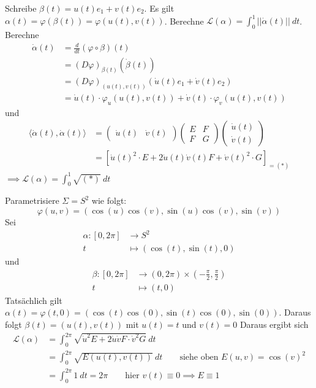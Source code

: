 \documentclass[../main.tex]{subfiles}
\begin{document}
Schreibe $\beta (t) = u(t)e_1 + v(t)e_2$. Es gilt $\alpha(t) = \varphi(\beta(t))=\varphi(u(t),v(t))$.
Berechne $\mathcal{L}(\alpha)= \int _0^1 ||\dot{\alpha}(t)|| \ dt$.
Berechne \begin{align*}
    \dot{\alpha}(t) &= \frac{d}{dt}(\varphi \circ \beta)(t) \\
    &= (D\varphi)_{\beta(t)}(\dot{\beta}(t)) \\
    &= (D\varphi)_{(u(t), v(t))}(\dot{u}(t)e_1 + \dot{v}(t)e_2) \\
    &= \dot{u}(t) \cdot \varphi_u(u(t),v(t))+\dot{v}(t) \cdot \varphi_v(u(t),v(t))
\end{align*} und 
\begin{align*}
    \langle \dot{\alpha}(t), \dot{\alpha}(t) \rangle &= \begin{pmatrix}
        \dot{u}(t) & \dot{v}(t)
    \end{pmatrix}\begin{pmatrix}
        E & F \\ F & G
    \end{pmatrix}\begin{pmatrix}
        \dot{u}(t) \\ \dot{v}(t)
    \end{pmatrix} \\
    &= \left[ \dot{u}(t)^2 \cdot E + 2\dot{u}(t)\dot{v}(t)F + \dot{v}(t)^2\cdot G \right]_{=(*)}
\end{align*}
$\implies \mathcal{L} (\alpha) = \int _0^1 \sqrt{(*)} \ dt$

\begin{example}
    Parametrisiere $\Sigma = S^2$ wie folgt:
    $$\varphi (u,v)= (\cos(u)\cos(v),\sin(u)\cos(v),\sin(v))$$
    Sei 
    \begin{align*}
        \alpha : [0,2\pi] &\to S^2 \\
        t &\mapsto (\cos(t), \sin(t), 0)
    \end{align*}
    und
    \begin{align*}
        \beta : [0, 2\pi] &\to (0,2\pi) \times (-\frac{\pi}{2}, \frac{\pi}{2}) \\
        t &\mapsto (t,0)
    \end{align*}
    Tatsächlich gilt $\alpha (t)=\varphi(t,0) = (\cos(t)\cos(0),\sin(t)\cos(0),\sin(0))$. Daraus folgt
    $\beta(t)= (u(t), v(t))$ mit $u(t)=t$ und $v(t)=0$
    Daraus ergibt sich
    \begin{align*}
        \mathcal{L}(\alpha) &= \int_0^{2\pi} \sqrt{\dot{u}^2E+2\dot{u}\dot{v}F\cdot \dot{v}^2G} \ dt \\
        &= \int_0^{2\pi} \sqrt{E (u(t),v(t))} \ dt \qquad \text{siehe oben } E(u,v) = \cos(v)^2 \\
        &= \int_0^{2\pi} 1 \ dt = 2\pi \qquad \text{hier } v(t)\equiv 0 \implies E\equiv 1
    \end{align*}
\end{example}
\end{document}
